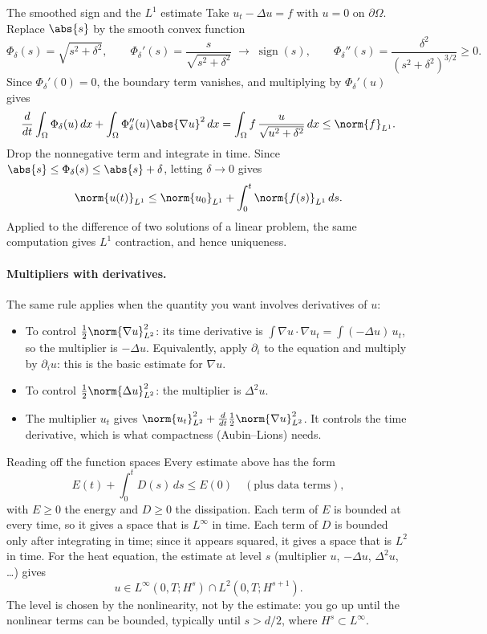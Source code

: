 \begin{exbox}{The smoothed sign and the $L^1$ estimate}
Take $u_t-\Delta u=f$ with $u=0$ on $\partial\Omega$. Replace $\abs{s}$ by the smooth convex function
\[
\Phi_\delta(s)=\sqrt{s^2+\delta^2},\qquad
\Phi_\delta'(s)=\frac{s}{\sqrt{s^2+\delta^2}}\;\longrightarrow\;\operatorname{sign}(s),\qquad
\Phi_\delta''(s)=\frac{\delta^2}{(s^2+\delta^2)^{3/2}}\ge 0 .
\]
Since $\Phi_\delta'(0)=0$, the boundary term vanishes, and multiplying by $\Phi_\delta'(u)$ gives
\[
\frac{d}{dt}\int_\Omega \Phi_\delta(u)\,dx+\int_\Omega \Phi_\delta''(u)\abs{\nabla u}^2\,dx=\int_\Omega f\,\frac{u}{\sqrt{u^2+\delta^2}}\,dx\le \norm{f}_{L^1}.
\]
Drop the nonnegative term and integrate in time. Since $\abs{s}\le\Phi_\delta(s)\le\abs{s}+\delta$, letting $\delta\to 0$ gives
\[
\norm{u(t)}_{L^1}\le \norm{u_0}_{L^1}+\int_0^t\norm{f(s)}_{L^1}\,ds .
\]
Applied to the difference of two solutions of a linear problem, the same computation gives $L^1$ contraction, and hence uniqueness.
\end{exbox}

\paragraph{Multipliers with derivatives.} The same rule applies when the quantity you want involves derivatives of $u$:
\begin{itemize}
\item To control $\frac12\norm{\nabla u}_{L^2}^2$: its time derivative is $\int\nabla u\cdot\nabla u_t=\int(-\Delta u)\,u_t$, so the multiplier is $-\Delta u$. Equivalently, apply $\partial_i$ to the equation and multiply by $\partial_i u$: this is the basic estimate for $\nabla u$.
\item To control $\frac12\norm{\Delta u}_{L^2}^2$: the multiplier is $\Delta^2 u$.
\item The multiplier $u_t$ gives $\norm{u_t}_{L^2}^2+\frac{d}{dt}\frac12\norm{\nabla u}_{L^2}^2$. It controls the time derivative, which is what compactness (Aubin--Lions) needs.
\end{itemize}

\begin{rmkbox}{Reading off the function spaces}
Every estimate above has the form
\[
E(t)+\int_0^t D(s)\,ds\le E(0)\quad(\text{plus data terms}),
\]
with $E\ge 0$ the energy and $D\ge 0$ the dissipation. Each term of $E$ is bounded at every time, so it gives a space that is $L^\infty$ in time. Each term of $D$ is bounded only after integrating in time; since it appears squared, it gives a space that is $L^2$ in time. For the heat equation, the estimate at level $s$ (multiplier $u$, $-\Delta u$, $\Delta^2u$, \dots) gives
\[
u\in L^\infty(0,T;H^s)\cap L^2(0,T;H^{s+1}).
\]
The level is chosen by the nonlinearity, not by the estimate: you go up until the nonlinear terms can be bounded, typically until $s>d/2$, where $H^s\subset L^\infty$.
\end{rmkbox}

